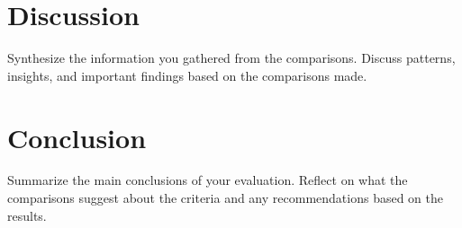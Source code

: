 \documentclass[12pt]{article}
\begin{document}
\section*{Discussion}
Synthesize the information you gathered from the comparisons. Discuss patterns, insights, and important findings based on the comparisons made.

\section*{Conclusion}
Summarize the main conclusions of your evaluation. Reflect on what the comparisons suggest about the criteria and any recommendations based on the results.

\newpage
\printbibliography
\end{document}
